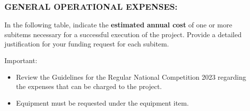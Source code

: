 \documentclass[MAIN.tex]{subfiles}
\begin{document}
\newpage

\subsubsection*{\uppercase{General operational expenses:}}

In the following table, indicate the \textbf{estimated annual cost} of one or more subitems necessary for a successful execution of the project. Provide a detailed justification for your funding request for each subitem.

\medskip

\noindent Important:
\begin{itemize}[nosep]
\item Review the Guidelines for the Regular National Competition 2023 regarding the expenses that can be charged to the project.
\item Equipment must be requested under the equipment item.
\end{itemize}
\end{document}
